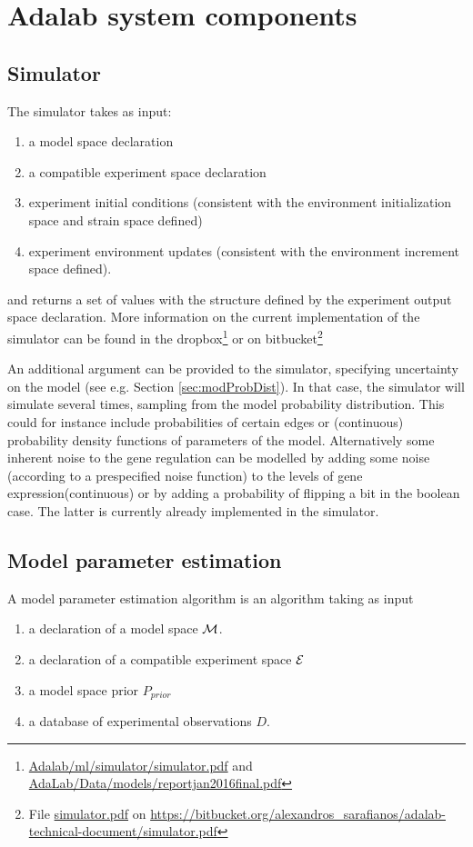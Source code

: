 \documentclass{article}
\begin{document}
\section{Adalab system components}

\subsection{Simulator}
The simulator takes as input:
\begin{enumerate}
\item a model space declaration
\item a compatible experiment space declaration
\item experiment initial conditions (consistent with the environment initialization space and strain space defined)
\item experiment environment updates (consistent with the environment increment space defined).
\end{enumerate}

and returns a set of values with the structure defined by the experiment output space declaration.
More information on the current implementation of the simulator can be found in the dropbox\footnote{\url{Adalab/ml/simulator/simulator.pdf} 
and \url{AdaLab/Data/models/reportjan2016final.pdf}} or on bitbucket\footnote{File \url{simulator.pdf} on \url{https://bitbucket.org/alexandros_sarafianos/adalab-technical-document/simulator.pdf}}

An additional argument can be provided to the simulator, specifying uncertainty on the model (see e.g. Section \ref{sec:modProbDist}).  In that case, the simulator will simulate several times, sampling from the model probability distribution.  
This could for instance include probabilities of certain edges or (continuous) probability density functions of parameters of the model. Alternatively some inherent noise to the gene regulation can be modelled by adding some noise (according to a prespecified
noise function) to the levels of gene expression(continuous) or by adding a probability of flipping a bit in the boolean case. The latter is currently already implemented in the simulator.

\subsection{Model parameter estimation}

A model parameter estimation algorithm is an algorithm taking as input
\begin{enumerate}
\item a declaration of a model space $\mathcal{M}$.
\item a declaration of a compatible experiment space $\mathcal{E}$
\item a model space prior $P_{prior}$
\item a database of experimental observations $D$.
\end{enumerate}
\end{document}
